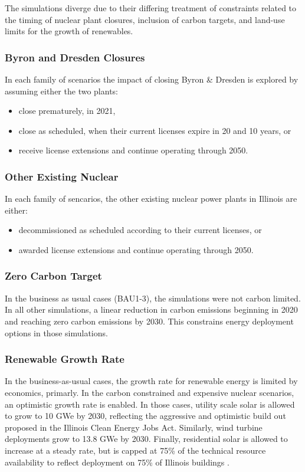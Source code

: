 The simulations diverge due to their differing treatment of constraints related 
to the timing of nuclear plant closures, inclusion of 
carbon targets, and land-use limits for the growth of renewables.

\subsubsection{Byron and Dresden Closures}
In each family of scenarios the impact of closing Byron \& Dresden is explored 
by assuming either the two plants: 
\begin{itemize} 
        \item close prematurely, in 2021,
        \item close as scheduled, when their current licenses expire in 20 and 10 
        years, or
        \item receive license extensions and continue operating through 2050.
\end{itemize}


\subsubsection{Other Existing Nuclear}
In each family of sencarios, the other existing nuclear power plants in 
Illinois are  either:
\begin{itemize}
        \item decommissioned as scheduled according to their current 
licenses, or 
        \item awarded license extensions and continue operating through 2050.
\end{itemize}

\subsubsection{Zero Carbon Target}
In the business as usual cases (BAU1-3), the simulations were not carbon limited. In all 
other simulations, a linear reduction in carbon emissions beginning in 2020 and 
reaching zero carbon emissions by 2030. This constrains energy 
deployment options in those simulations.

\subsubsection{Renewable Growth Rate}
In the business-as-usual cases, the growth rate for renewable energy is limited by economics, 
primarly. In the carbon constrained and expensive nuclear scenarios, an 
optimistic growth rate is enabled.
In those cases, utility scale solar is allowed to grow to 10 GWe by 2030, 
reflecting the aggressive and optimistic build out proposed in the Illinois 
Clean Energy Jobs Act. Similarly, wind turbine deployments grow to 13.8 GWe 
by 2030. Finally, residential solar is allowed to 
increase at a steady rate, but is capped at 75\% of the technical resource 
availability to reflect deployment on 75\% of Illinois buildings 
\cite{gagnon_rooftop_2016}. 

